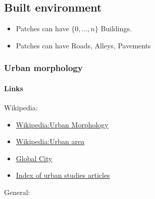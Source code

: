 \documentclass[]{article}
\begin{document}
\subsection{Built environment}\label{built-environment}

\begin{itemize}
\itemsep1pt\parskip0pt
\item
  Patches can have \(\{0,...,n\}\) Buildings.
\item
  Patches can have Roads, Alleys, Pavements
\end{itemize}

\subsubsection{Urban morphology}\label{urban-morphology}

\paragraph{Links}\label{links}

Wikipedia:

\begin{itemize}
\itemsep1pt\parskip0pt
\item
  \href{http://en.wikipedia.org/wiki/Urban_morphology}{Wikipedia:Urban
  Morphology}
\item
  \href{http://en.wikipedia.org/wiki/Urban_area}{Wikipedia:Urban area}
\item
  \href{http://en.wikipedia.org/wiki/Global_City}{Global City}
\item
  \href{http://en.wikipedia.org/wiki/Index_of_urban_studies_articles}{Index
  of urban studies articles}
\end{itemize}

General:
\end{document}
